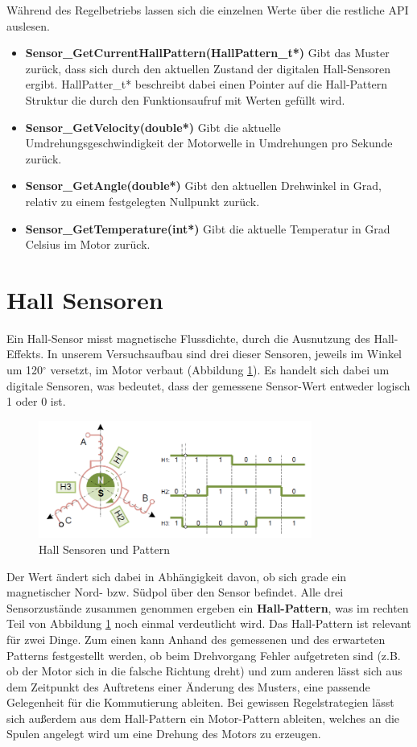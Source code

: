 \noindent
Während des Regelbetriebs lassen sich die einzelnen Werte über die restliche API auslesen.

\begin{itemize}
\item \textbf{Sensor\_GetCurrentHallPattern(HallPattern\_t*)} Gibt das Muster zurück, dass sich durch den aktuellen Zustand der digitalen Hall-Sensoren ergibt. HallPatter\_t* beschreibt dabei einen Pointer auf die Hall-Pattern Struktur die durch den Funktionsaufruf mit Werten gefüllt wird.
\item \textbf{Sensor\_GetVelocity(double*)} Gibt die aktuelle Umdrehungsgeschwindigkeit der Motorwelle in Umdrehungen pro Sekunde zurück.
\item \textbf{Sensor\_GetAngle(double*)} Gibt den aktuellen Drehwinkel in Grad, relativ zu einem festgelegten Nullpunkt zurück.
\item \textbf{Sensor\_GetTemperature(int*)} Gibt die aktuelle Temperatur in Grad Celsius im Motor zurück.
\end{itemize}

\section{Hall Sensoren}
Ein Hall-Sensor misst magnetische Flussdichte, durch die Ausnutzung des Hall-Effekts. In unserem Versuchsaufbau sind drei dieser Sensoren, jeweils im Winkel um 120$^\circ$ versetzt, im Motor verbaut (Abbildung \ref{img:hall_sample}). Es handelt sich dabei um digitale Sensoren, was bedeutet, dass der gemessene Sensor-Wert entweder logisch 1 oder 0 ist.

\begin{figure}[ht]
\centering
\includegraphics[width=0.8\textwidth]{sensor/hall_sample.PNG}
\caption{Hall Sensoren und Pattern}
\label{img:hall_sample}
\end{figure}

Der Wert ändert sich dabei in Abhängigkeit davon, ob sich grade ein magnetischer Nord- bzw. Südpol über den Sensor befindet. Alle drei Sensorzustände zusammen genommen ergeben ein \textbf{Hall-Pattern}, was im rechten Teil von Abbildung \ref{img:hall_sample} noch einmal verdeutlicht wird. Das Hall-Pattern ist relevant für zwei Dinge. Zum einen kann Anhand des gemessenen und des erwarteten Patterns festgestellt werden, ob beim Drehvorgang Fehler aufgetreten sind (z.B. ob der Motor sich in die falsche Richtung dreht) und zum anderen lässt sich aus dem Zeitpunkt des Auftretens einer Änderung des Musters, eine passende Gelegenheit für die Kommutierung ableiten. Bei gewissen Regelstrategien lässt sich außerdem aus dem Hall-Pattern ein Motor-Pattern ableiten, welches an die Spulen angelegt wird um eine Drehung des Motors zu erzeugen.

